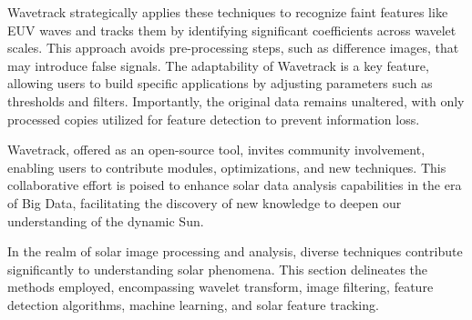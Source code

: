Wavetrack strategically applies these techniques to recognize faint features like EUV waves and tracks them by identifying significant coefficients across wavelet scales. This approach avoids pre-processing steps, such as difference images, that may introduce false signals. The adaptability of Wavetrack is a key feature, allowing users to build specific applications by adjusting parameters such as thresholds and filters. Importantly, the original data remains unaltered, with only processed copies utilized for feature detection to prevent information loss.

Wavetrack, offered as an open-source tool, invites community involvement, enabling users to contribute modules, optimizations, and new techniques. This collaborative effort is poised to enhance solar data analysis capabilities in the era of Big Data, facilitating the discovery of new knowledge to deepen our understanding of the dynamic Sun.

In the realm of solar image processing and analysis, diverse techniques contribute significantly to understanding solar phenomena. This section delineates the methods employed, encompassing wavelet transform, image filtering, feature detection algorithms, machine learning, and solar feature tracking.

